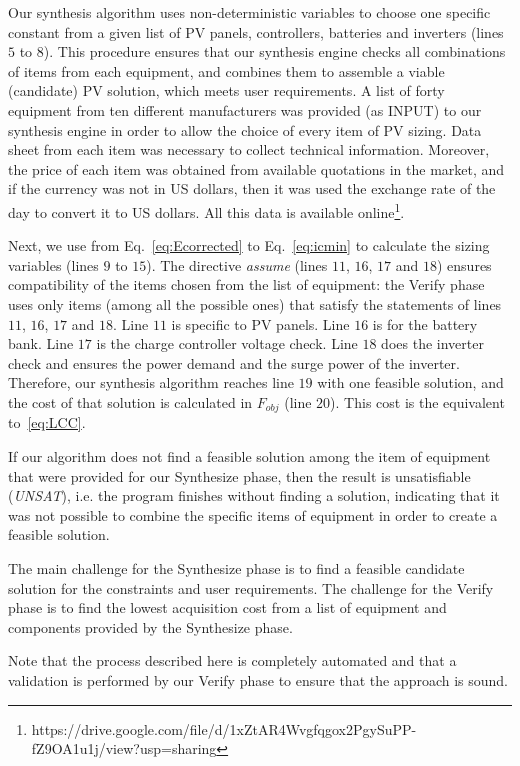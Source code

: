 \documentclass[runningheads]{llncs}
\begin{document}
Our synthesis algorithm uses non-deterministic variables to choose one specific constant from a given list of PV panels, controllers, batteries and inverters (lines $5$ to $8$). This procedure ensures that our synthesis engine checks all combinations of items from each equipment, and combines them to assemble a viable (candidate) PV solution, which meets user requirements. A list of forty equipment from ten different manufacturers was provided (as INPUT) to our synthesis engine in order to allow the choice of every item of PV sizing. Data sheet from each item was necessary to collect technical information. Moreover, the price of each item was obtained from available quotations in the market, and if the currency was not in US dollars, then it was used the exchange rate of the day to convert it to US dollars. All this data is available online\footnote{https://drive.google.com/file/d/1xZtAR4Wvgfqgox2PgySuPP-fZ9OA1u1j/view?usp=sharing}.

Next, we use from Eq.~\eqref{eq:Ecorrected} to Eq.~\eqref{eq:icmin} to calculate the sizing variables (lines $9$ to $15$). The directive \textit{assume} (lines $11$, $16$, $17$ and $18$) ensures compatibility of the items chosen from the list of equipment: the {\sc Verify} phase uses only items (among all the possible ones) that satisfy the statements of lines $11$, $16$, $17$ and $18$. Line $11$ is specific to PV panels. Line $16$ is for the battery bank. Line $17$ is the charge controller voltage check. Line $18$ does the inverter check and ensures the power demand and the surge power of the inverter.
Therefore, our synthesis algorithm reaches line $19$ with one feasible solution, and the cost of that solution is calculated in $F_{obj}$ (line $20$). This cost is the equivalent to~\ref{eq:LCC}.

If our algorithm does not find a feasible solution among the item of equipment that were provided for our {\sc Synthesize} phase,  then the result is unsatisfiable (\textit{UNSAT}), i.e. the program finishes without finding a solution, indicating that it was not possible to combine the specific items of equipment in order to create a feasible solution. 

The main challenge for the {\sc Synthesize} phase is to find a feasible candidate solution for the constraints and user requirements. The challenge for the {\sc Verify} phase is to find the lowest acquisition cost from a list of equipment and components provided by the {\sc Synthesize} phase. 

Note that the process described here is completely automated and that a validation is performed by our {\sc Verify} phase to ensure that the approach is sound.
\end{document}

